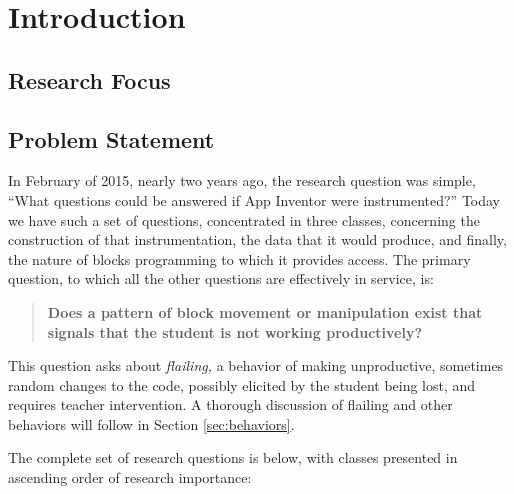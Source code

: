 \chapter{Introduction}

\section{Research Focus}
 
\section{Problem Statement} \label{sec:problem-statement}

In February of 2015, nearly two years ago, the research question was simple, ``What questions could be answered if App Inventor were instrumented?'' Today we have such a set of questions, concentrated in three classes, concerning the construction of that instrumentation, the data that it would produce, and finally, the nature of blocks programming to which it provides access. The primary question, to which all the other questions are effectively in service, is:

\begin{quote}
\textbf{Does a pattern of block movement or manipulation exist that signals that the student is not working productively?}
\end{quote}

This question asks about \emph{flailing,} a behavior of making unproductive, sometimes random changes to the code, possibly elicited by the student being lost, and requires teacher intervention. A thorough discussion of flailing and other behaviors will follow in Section \ref{sec:behaviors}.

The complete set of research questions is below, with classes presented in ascending order of research importance:

